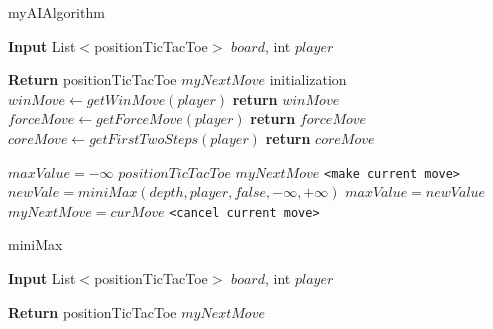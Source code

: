\documentclass[a4paper]{article}
\begin{document}
\begin{algorithm}
\caption{myAIAlgorithm}
\begin{algorithmic}[]

\State \textbf{Input} List$<$positionTicTacToe$>$ $board$, int $player$

\State \textbf{Return} positionTicTacToe $myNextMove$
\State
{}     
\State
\State initialization
\State
\State $ winMove \gets getWinMove(player)$  
    \State  \textbf{return} $winMove$
\EndIf
\State
\State $ forceMove \gets getForceMove(player)$  
    \State  \textbf{return} $forceMove$
\EndIf
\State
\State $ coreMove \gets getFirstTwoSteps(player)$  
    \State  \textbf{return} $coreMove$
\EndIf
\State

\State $maxValue = -\infty$
\State $positionTicTacToe$ $myNextMove$
\State
\Do {}
        \State \texttt{<make current move>}
	  \State $newVale = miniMax(depth, player, false, -\infty, +\infty)$
    	           \State  $maxValue = newValue$
		     \State $myNextMove =curMove$
         \EndIf
	   \State \texttt{<cancel current move>}  
      \EndFor

\EndProcedure
\end{algorithmic}
\end{algorithm}

\begin{algorithm}
\caption{miniMax}
\begin{algorithmic}[]

\State \textbf{Input} List$<$positionTicTacToe$>$ $board$, int $player$

\State \textbf{Return} positionTicTacToe $myNextMove$



\EndProcedure
\end{algorithmic}
\end{algorithm}
\end{document}
